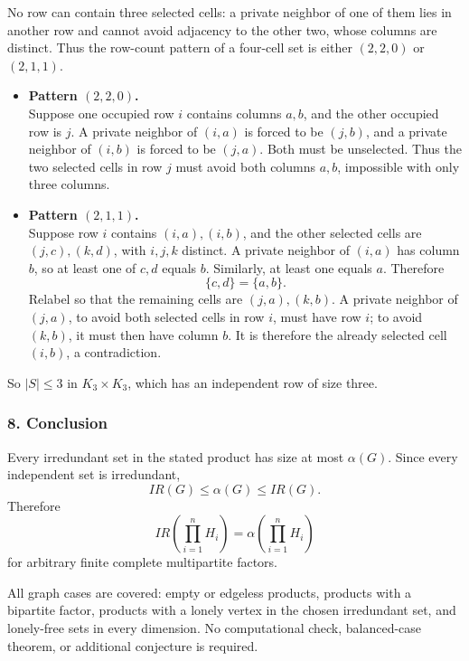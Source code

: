 \documentclass[
  11pt,
  a4paper,
]{article}
\begin{document}
No row can contain three selected cells: a private neighbor of one of
them lies in another row and cannot avoid adjacency to the other two,
whose columns are distinct. Thus the row-count pattern of a four-cell
set is either \((2,2,0)\) or \((2,1,1)\).

\begin{itemize}
\item
  \textbf{Pattern \((2,2,0)\).}\\
  Suppose one occupied row \(i\) contains columns \(a,b\), and the other
  occupied row is \(j\). A private neighbor of \((i,a)\) is forced to be
  \((j,b)\), and a private neighbor of \((i,b)\) is forced to be
  \((j,a)\). Both must be unselected. Thus the two selected cells in row
  \(j\) must avoid both columns \(a,b\), impossible with only three
  columns.
\item
  \textbf{Pattern \((2,1,1)\).}\\
  Suppose row \(i\) contains \((i,a),(i,b)\), and the other selected
  cells are \((j,c),(k,d)\), with \(i,j,k\) distinct. A private neighbor
  of \((i,a)\) has column \(b\), so at least one of \(c,d\) equals
  \(b\). Similarly, at least one equals \(a\). Therefore \[
  \{c,d\}=\{a,b\}.
  \] Relabel so that the remaining cells are \((j,a),(k,b)\). A private
  neighbor of \((j,a)\), to avoid both selected cells in row \(i\), must
  have row \(i\); to avoid \((k,b)\), it must then have column \(b\). It
  is therefore the already selected cell \((i,b)\), a contradiction.
\end{itemize}

So \(|S|\le3\) in \(K_3\times K_3\), which has an independent row of
size three.

\subsubsection{8. Conclusion}\label{conclusion}

Every irredundant set in the stated product has size at most
\(\alpha(G)\). Since every independent set is irredundant, \[
IR(G)\le\alpha(G)\le IR(G).
\] Therefore \[
\boxed{IR\!\left(\prod_{i=1}^{n}H_i\right)
=\alpha\!\left(\prod_{i=1}^{n}H_i\right)}
\] for arbitrary finite complete multipartite factors.

All graph cases are covered: empty or edgeless products, products with a
bipartite factor, products with a lonely vertex in the chosen
irredundant set, and lonely-free sets in every dimension. No
computational check, balanced-case theorem, or additional conjecture is
required.
\end{document}
